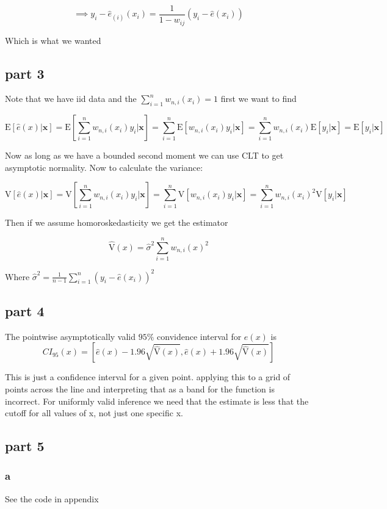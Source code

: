 \documentclass[11pt]{article}
\newcommand{\E}{\mathrm{E}}
\newcommand{\V}{\mathrm{V}}
\begin{document}
$$\implies y_i - \hat{e}_{(i)}(x_i) = \frac{1}{1-w_{ij}}(y_i - \hat{e}(x_i))
$$

Which is what we wanted 

\subsection{part 3}
Note that we have iid data and the $\sum_{i=1}^{n}w_{n,i}(x_i)=1$ first we want to find 

$$ \E[\hat{e}(x)|\bm{x}] = \E\left[ \sum_{i=1}^{n} w_{n,i}(x_i)y_i|\bm{x} \right] = \sum_{i=1}^{n}\E\left[  w_{n,i}(x_i)y_i|\bm{x} \right]= \sum_{i=1}^{n}  w_{n,i}(x_i) \E\left[ y_i|\bm{x} \right] = \E[y_i|\bm{x}]
$$

Now as long as we have a bounded second moment we can use CLT to get asymptotic normality. Now to calculate the variance:

$$ \V[\hat{e}(x)|\bm{x}] = \V \left[ \sum_{i=1}^{n} w_{n,i}(x_i)y_i |\bm{x}  \right] =  \sum_{i=1}^{n} \V \left[ w_{n,i}(x_i)y_i |\bm{x}  \right] = \sum_{i=1}^{n} w_{n,i}(x_i)^2 \V \left[y_i |\bm{x}  \right]
$$

Then if we assume homoroskedasticity we get the estimator

$$\hat{\V}(x) = \hat{\sigma}^2 \sum_{i=1}^{n}w_{n,i}(x)^2$$

	
Where 
$\hat{\sigma}^2 = \frac{1}{n-1} \sum_{i=1}^{n} (y_i - \hat{e}(x_i))^2$

\subsection{part 4}

The pointwise asymptotically valid $95\% $ convidence interval for $e(x)$ is 
$$CI_{95}(x) = [\hat{e}(x) - 1.96 \sqrt{\hat{\V}(x)}, \hat{e}(x) + 1.96 \sqrt{\hat{\V}(x)}] $$

This is just a confidence interval for a given point. applying this to a grid of points across the line and interpreting that as a band for the function is incorrect. For uniformly valid inference we need that the estimate is less that the cutoff for all values of x, not just one specific x. 

\subsection{part 5}
\subsubsection{a}
See the code in appendix 
\end{document}
